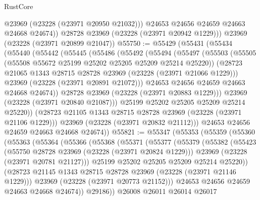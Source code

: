 \begin{lexlean}{RustCore}
\begin{coremodule}
            @23969
            (@23228 (@23971 @20950 @21032)))
          @24653
          @24656
          @24659
          @24663
          @24668
          @24674))
      @28728
      @23969
      (@23228 (@23971 @20942 @1229)))
    @23969
    (@23228 (@23971 @20899 @21047))
@55750 := @55429
    (@55431
      (@55434
        (@55440
          (@55442
            (@55445
              (@55486
                (@55492
                  (@55494
                    (@55497
                      (@55503
                        (@55505 (@55508 @55672 @25199 @25202 @25205 @25209 @25214 @25220))
                        (@28723 @21065 @1343 @28715 @28728 @23969 (@23228 (@23971 @21066 @1229)))
                        @23969
                        (@23228 (@23971 @20891 @21072)))
                      @24653
                      @24656
                      @24659
                      @24663
                      @24668
                      @24674))
                  @28728
                  @23969
                  (@23228 (@23971 @20883 @1229)))
                @23969
                (@23228 (@23971 @20840 @21087)))
              @25199
              @25202
              @25205
              @25209
              @25214
              @25220))
          (@28723 @21105 @1343 @28715 @28728 @23969 (@23228 (@23971 @21106 @1229)))
          @23969
          (@23228 (@23971 @20832 @21112)))
        @24653
        @24656
        @24659
        @24663
        @24668
        @24674))
@55821 := @55347
    (@55353
      (@55359
        (@55360
          (@55363
            (@55364
              (@55366
                (@55368
                  (@55371
                    (@55377
                      (@55379
                        (@55382
                          (@55423
                            (@55750 @28728 @23969 (@23228 (@23971 @20824 @1229)))
                            @23969
                            (@23228 (@23971 @20781 @21127)))
                          @25199
                          @25202
                          @25205
                          @25209
                          @25214
                          @25220))
                      (@28723 @21145 @1343 @28715 @28728 @23969 (@23228 (@23971 @21146 @1229)))
                      @23969
                      (@23228 (@23971 @20773 @21152)))
                    @24653
                    @24656
                    @24659
                    @24663
                    @24668
                    @24674))
                @29186))
            @26008
            @26011
            @26014
            @26017

\end{coremodule}
\end{lexlean}
